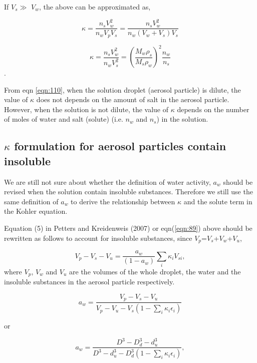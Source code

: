\documentclass[12pt]{article}
\begin{document}
\begin{itemize}
If $V_{s}$$\gg$ $V_{w}$, the above can be approximated as,


\begin{equation}\label{eqn:111}
\kappa=\frac{n_{s}V_{w}^{2}}{n_{w}V_{p} V_{s}}= \frac{n_{s}V_{w}^{2}}{n_{w} (V_{w}+V_{s}) V_{s}}
\end{equation}

\begin{equation}\label{eqn:112}
\kappa=\frac{n_{s}V_{w}^{2}}{n_{w} V_{s}^{2}}= (\frac{M_{w} \rho_{s}}{ M_{s} \rho_{w}})^{2} \frac{n_{w}}{n_{s}}
\end{equation}.

From eqn \ref{eqn:110}, when the solution droplet (aerosol particle)  is dilute, the value of $\kappa$ does not depends on the amount of salt in the aerosol particle. However, when the solution is not dilute, the value of $\kappa$ depends on the number of moles of water and salt (solute)  (i.e. $n_{w}$ and $n_{s}$) in the solution.

\subsection{$\kappa$ formulation for aerosol particles contain insoluble}

We are still not sure about whether the definition of water activity, $a_{w}$ should be revised when the solution contain insoluble substances. Therefore we still use the same definition of $a_{w}$ to derive the relationship between $\kappa$ and the solute term in the Kohler equation.


Equation (5) in Petters and  Kreidenweis (2007) or eqn(\ref{eqn:89}) above  should be rewritten as follows to account for insoluble substances, since $V_{p}$=$V_{s}$+$V_{w}$+$V_{u}$,

\begin{equation}
V_{p}-V_{s}-V_{u}=\frac {a_{w}}{(1-a_{w})} \sum_{i} \kappa_{i} V_{si},
\end{equation}
where $V_{p}$, $V_{w}$ and $V_{u}$ are the volumes of the whole droplet, the water and the insoluble substances in the aerosol particle respectively.


\begin{equation}
a_{w}= \frac {V_{p}-V_{s}-V_{u}}{V_{p} -V_{u}- V_{s} (1- \sum_{i} \kappa_{i} \epsilon_{i})}
\end{equation}

 or
 
 \begin{equation}
a_{w}= \frac {D^{3}-D_{d}^{3}-d_{u}^{3}}{D^{3}- d_{u}^{3}- D_{d}^{3} (1- \sum_{i} \kappa_{i} \epsilon_{i})},
\end{equation}


\end{itemize}
\end{document}
